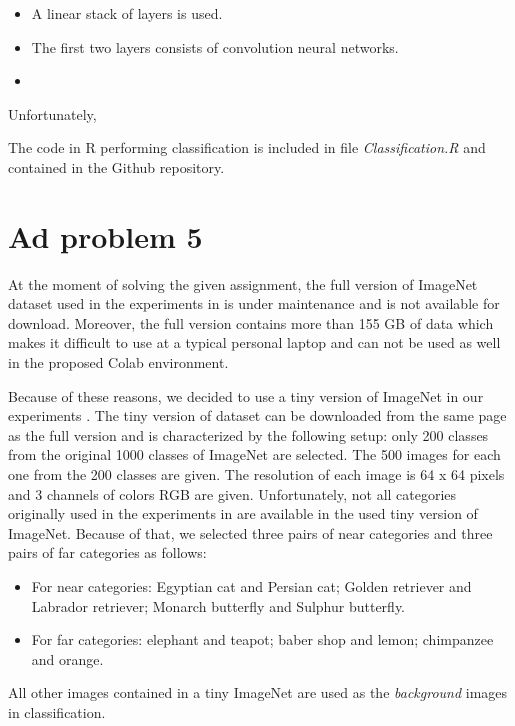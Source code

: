\documentclass{article} %
\begin{document}
\begin{itemize}
	\item A linear stack of layers is used.
	\item The first two layers consists of convolution neural networks.
	\item 
\end{itemize}

Unfortunately, 

The code in R performing classification is included in file \textit{Classification.R} and contained in the Github repository.

\section{Ad problem 5}

At the moment of solving the given assignment, the full version of ImageNet dataset used in the experiments in \citep{du2018adapting} is under maintenance and is not available for download. Moreover, the full version contains more than 155 GB of data which makes it difficult to use at a typical personal laptop and can not be used as well in the proposed Colab environment. 

Because of these reasons, we decided to use a tiny version of ImageNet in our experiments \citep{ImageNet}. The tiny version of dataset can be downloaded from the same page as the full version and is characterized by the following setup: only 200 classes from the original 1000 classes of ImageNet are selected. The 500 images for each one from the 200 classes are given. The resolution of each image is 64 x 64 pixels and 3 channels of colors RGB are given. Unfortunately, not all categories originally used in the experiments in \cite{du2018adapting} are available in the used tiny version of ImageNet. Because of that, we selected three pairs of near categories and three pairs of far categories as follows:

\begin{itemize}
	\item For near categories: Egyptian cat and Persian cat; Golden retriever and Labrador retriever; Monarch butterfly and Sulphur butterfly.
	\item For far categories: elephant and teapot; baber shop and lemon; chimpanzee and orange.
\end{itemize}  

All other images contained in a tiny ImageNet are used as the \textit{background} images in classification.
\end{document}
